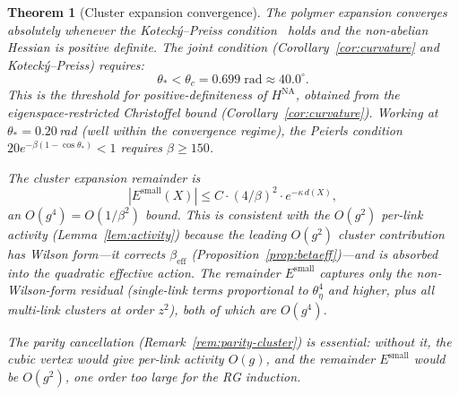 \documentclass[11pt]{article}
\newtheorem{theorem}{Theorem}[section]
\theoremstyle{definition}
\begin{document}
\begin{theorem}[Cluster expansion convergence]\label{thm:cluster}
The polymer expansion converges absolutely whenever the
Koteck\'y--Preiss condition~\cite{KP} holds and the non-abelian
Hessian is positive definite.  The joint condition
(Corollary~\ref{cor:curvature} and Koteck\'y--Preiss) requires:
\begin{equation}
\theta_*<\theta_c=0.699\;\mathrm{rad}
\approx 40.0^\circ.
\end{equation}
This is the threshold for positive-definiteness of $H^{\mathrm{NA}}$,
obtained from the eigenspace-restricted Christoffel bound
(Corollary~\ref{cor:curvature}).
Working at $\theta_*=0.20$\,rad (well within the convergence regime),
the Peierls condition $20e^{-\beta(1-\cos\theta_*)}<1$
requires $\beta\ge 150$.

The cluster expansion remainder is
\begin{equation}\label{eq:remainder}
|E^{\mathrm{small}}(X)|\le C\cdot(4/\beta)^2\cdot e^{-\kappa\,d(X)},
\end{equation}
an $O(g^4)=O(1/\beta^2)$ bound.  This is consistent with the
$O(g^2)$ per-link activity (Lemma~\ref{lem:activity}) because the
leading $O(g^2)$ cluster contribution has Wilson form---it corrects
$\beta_{\mathrm{eff}}$
(Proposition~\ref{prop:betaeff})---and is \emph{absorbed} into the
quadratic effective action.  The remainder $E^{\mathrm{small}}$
captures only the non-Wilson-form residual (single-link terms
proportional to $\theta_\eta^4$ and higher, plus all multi-link
clusters at order $z^2$), both of which are $O(g^4)$.

The parity cancellation (Remark~\ref{rem:parity-cluster}) is
essential: without it, the cubic vertex would give per-link
activity $O(g)$, and the remainder $E^{\mathrm{small}}$ would
be $O(g^2)$, one order too large for the RG induction.
\end{theorem}
\end{document}
